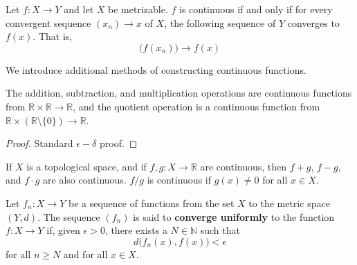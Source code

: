 \documentclass{article}
\begin{document}
  \begin{theorem}
  Let $f: X \longrightarrow Y$ and let $X$ be metrizable. $f$ is continuous if and only if for every convergent sequence $(x_n) \rightarrow x$ of $X$, the following sequence of $Y$ converges to $f(x)$. That is, 
  \[\big( f(x_n) \big) \longrightarrow f(x)\]
  \end{theorem}

  We introduce additional methods of constructing continuous functions. 

  \begin{lemma}
  The addition, subtraction, and multiplication operations are continuous functions from $\mathbb{R} \times \mathbb{R} \longrightarrow \mathbb{R}$, and the quotient operation is a continuous function from $\mathbb{R} \times (\mathbb{R} \setminus \{0\}) \longrightarrow \mathbb{R}$. 
  \end{lemma}
  \begin{proof}
  Standard $\epsilon-\delta$ proof. 
  \end{proof}

  \begin{theorem}
  If $X$ is a topological space, and if $f, g: X \longrightarrow \mathbb{R}$ are continuous, then $f + g$, $f-g$, and $f \cdot g$ are also continuous. $f / g$ is continuous if $g(x) \neq 0$ for all $x \in X$. 
  \end{theorem}

  \begin{definition}
  Let $f_n: X \longrightarrow Y$ be a sequence of functions from the set $X$ to the metric space $(Y, d)$. The sequence $(f_n)$ is said to \textbf{converge uniformly} to the function $f: X \longrightarrow Y$ if, given $\epsilon > 0$, there exists a $N \in \mathbb{N}$ such that
  \[d\big( f_n(x), f(x)\big) < \epsilon\]
  for all $n \geq N$ and for all $x \in X$. 
  \end{definition}
\end{document}
